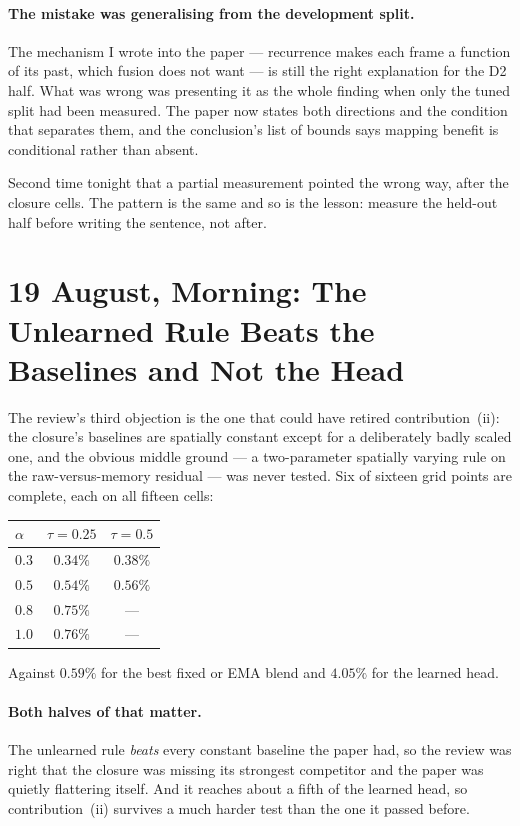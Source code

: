 \documentclass[11pt,a4paper]{article}
\begin{document}
\paragraph{The mistake was generalising from the development split.}
The mechanism I wrote into the paper --- recurrence makes each frame a function
of its past, which fusion does not want --- is still the right explanation for
the D2 half. What was wrong was presenting it as the whole finding when only the
tuned split had been measured. The paper now states both directions and the
condition that separates them, and the conclusion's list of bounds says mapping
benefit is conditional rather than absent.

Second time tonight that a partial measurement pointed the wrong way, after the
closure cells. The pattern is the same and so is the lesson: measure the held-out
half before writing the sentence, not after.


\section*{19 August, Morning: The Unlearned Rule Beats the Baselines and Not the Head}

The review's third objection is the one that could have retired contribution~(ii):
the closure's baselines are spatially constant except for a deliberately badly
scaled one, and the obvious middle ground --- a two-parameter spatially varying
rule on the raw-versus-memory residual --- was never tested. Six of sixteen grid
points are complete, each on all fifteen cells:

\begin{center}
\begin{tabular}{lcc}
\toprule
$\alpha$ & $\tau{=}0.25$ & $\tau{=}0.5$ \\
\midrule
$0.3$ & $0.34\%$ & $0.38\%$ \\
$0.5$ & $0.54\%$ & $0.56\%$ \\
$0.8$ & $0.75\%$ & --- \\
$1.0$ & $\mathbf{0.76\%}$ & --- \\
\bottomrule
\end{tabular}
\end{center}

Against $0.59\%$ for the best fixed or EMA blend and $4.05\%$ for the learned
head.

\paragraph{Both halves of that matter.} The unlearned rule \emph{beats} every
constant baseline the paper had, so the review was right that the closure was
missing its strongest competitor and the paper was quietly flattering itself. And
it reaches about a fifth of the learned head, so contribution~(ii) survives a
much harder test than the one it passed before.
\end{document}
